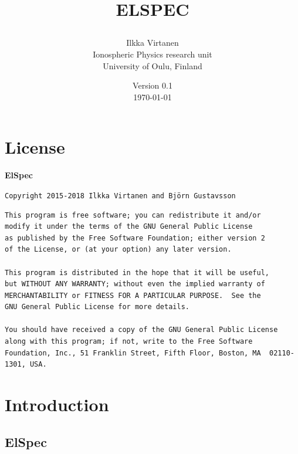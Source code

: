 \documentclass[12pt,a4paper]{report}
\title{ELSPEC \\
\author{Ilkka Virtanen\\
Ionospheric Physics research unit\\ University of Oulu, Finland}
\date{Version 0.1 \\ \today}                                           %
}
\begin{document}
\sloppy

\maketitle



\newpage

\chapter*{License}
{\small

{\bfseries ElSpec}
\vspace*{6pt}

\noindent \texttt{Copyright 2015-2018 Ilkka Virtanen and Bj{\"o}rn Gustavsson}
\vspace*{6pt}

\begin{verbatim}
This program is free software; you can redistribute it and/or
modify it under the terms of the GNU General Public License
as published by the Free Software Foundation; either version 2
of the License, or (at your option) any later version.

This program is distributed in the hope that it will be useful,
but WITHOUT ANY WARRANTY; without even the implied warranty of	
MERCHANTABILITY or FITNESS FOR A PARTICULAR PURPOSE.  See the
GNU General Public License for more details.

You should have received a copy of the GNU General Public License
along with this program; if not, write to the Free Software
Foundation, Inc., 51 Franklin Street, Fifth Floor, Boston, MA  02110-1301, USA.
\end{verbatim}
}




\newpage


\tableofcontents

\newpage




\chapter{Introduction}

\section{ElSpec}
\end{document}
